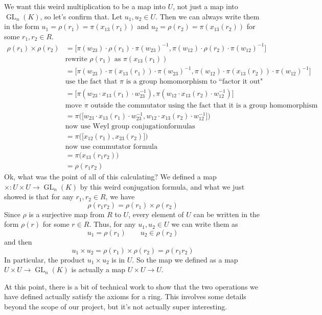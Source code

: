 \documentclass[12pt]{article}
\theoremstyle{definition}
\numberwithin{theorem}{subsection}
\newcommand{\lp}{\left(}
\newcommand{\rp}{\right)}
\newcommand{\inv}{^{-1}}
\DeclareMathOperator{\GL}{GL}
\begin{document}
We want this weird multiplication to be a map into $U$, not just a map into $\GL_n(K)$, so let's confirm that. Let $u_1, u_2 \in U$. Then we can always write them in the form $u_1 = \rho(r_1) = \pi(x_{13}(r_1))$ and $u_2 = \rho(r_2) = \pi(x_{13}(r_2))$ for some $r_1, r_2 \in R$.
\begin{align*}
	\rho(r_1) \times \rho(r_2) &= \Big[ \pi(w_{23}) \cdot \rho(r_1) \cdot \pi(w_{23}) \inv, \pi(w_{12}) \cdot \rho(r_2) \cdot \pi(w_{12}) \inv \Big] \\
	&\text{rewrite $\rho(r_1)$ as $\pi(x_{13}(r_1))$} \\
	&= \Big[ \pi( w_{23}) \cdot \pi(x_{13}(r_1)) \cdot \pi( w_{23} ) \inv ,  \pi(w_{12}) \cdot \pi( x_{13}(r_2) ) \cdot \pi( w_{12}) \inv \Big]  \\
	&\text{use the fact that $\pi$ is a group homomorphism to ``factor it out"} \\
	&= \Big[ \pi \lp w_{23} \cdot x_{13}(r_1) \cdot w_{23} \inv \rp, \pi \lp w_{12} \cdot x_{13}(r_2) \cdot w_{12} \inv \rp \Big]  \\
	&\text{move $\pi$ outside the commutator using the fact that it is a group homomorphism} \\
	&= \pi \Big( \big[ w_{23} \cdot x_{13}(r_1) \cdot w_{23} \inv, w_{12} \cdot x_{13}(r_2) \cdot w_{12} \inv \big] \Big) \\
	& \text{now use Weyl group conjugationformulas} \\
	&= \pi \Big( \big[ x_{12}(r_1), x_{23}(r_2) \big] \Big) \\
	& \text{now use commutator formula } \\
	&= \pi \Big( x_{13}(r_1 r_2) \Big)  \\
	&= \rho(r_1 r_2)	
\end{align*}
Ok, what was the point of all of this calculating? We defined a map $\times:U \times U \to \GL_n(K)$ by this weird conjugation formula, and what we just showed is that for any $r_1, r_2 \in R$, we have
\[
	\rho(r_1 r_2) = \rho(r_1) \times \rho(r_2)
\]
Since $\rho$ is a surjective map from $R$ to $U$, every element of $U$ can be written in the form $\rho(r)$ for some $r \in R$. Thus, for any $u_1, u_2 \in U$ we can write them as
\[
	u_1 = \rho(r_1) \qquad u_2 \in \rho(r_2)
\]
and then
\[
	u_1 \times u_2 = \rho(r_1) \times \rho(r_2) = \rho(r_1 r_2)
\]
In particular, the product $u_1 \times u_2$ is in $U$. So the map we defined as a map $U \times U \to \GL_n(K)$ is actually a map $U \times U \to U$.

At this point, there is a bit of technical work to show that the two operations we have defined actually satisfy the axioms for a ring. This involves some details beyond the scope of our project, but it's not actually super interesting. 
\end{document}
